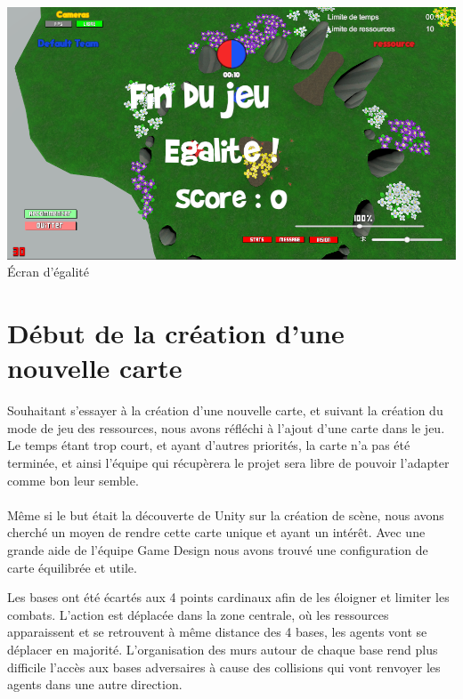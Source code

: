 \documentclass{report}
\begin{document}
\paragraph{}
\begin{center}
\includegraphics[scale=0.5]{DATA/egalite.png}
 {Écran d’égalité}
\end{center}
\paragraph{}

\section{Début de la création d’une nouvelle carte}

Souhaitant s’essayer à la création d’une nouvelle carte, et suivant la création du mode de jeu des ressources, nous avons réfléchi à l’ajout d’une carte dans le jeu. 
Le temps étant trop court, et ayant d’autres priorités, la carte n’a pas été terminée, et ainsi l’équipe qui récupèrera le projet sera libre de pouvoir l’adapter comme bon leur semble.
\paragraph{}

Même si le but était la découverte de Unity sur la création de scène, nous avons cherché un moyen de rendre cette carte unique et ayant un intérêt. 
Avec une grande aide de l’équipe Game Design nous avons trouvé une configuration de carte équilibrée et utile. 


Les bases ont été écartés aux 4 points cardinaux afin de les éloigner et limiter les combats. L’action est déplacée dans la zone centrale, où les ressources apparaissent et se retrouvent à même distance des 4 bases, les agents vont se déplacer en majorité. \newline
L’organisation des murs autour de chaque base rend plus difficile l’accès aux bases adversaires à cause des collisions qui vont renvoyer les agents dans une autre direction.
\end{document}
